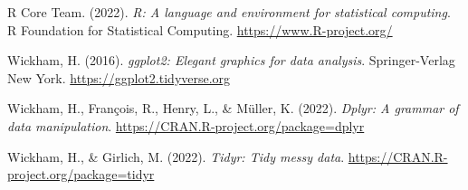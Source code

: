 \documentclass[
  man]{apa7}
\newlength{\cslhangindent}
\newlength{\cslentryspacingunit} %
\newenvironment{CSLReferences}[2] %
 {%
  \setlength{\parindent}{0pt}
  \ifodd #1
  \let\oldpar\par
  \def\par{\hangindent=\cslhangindent\oldpar}
  \fi
  \setlength{\parskip}{#2\cslentryspacingunit}
 }%
 {}
\begin{document}
\begin{CSLReferences}{1}{0}
\leavevmode{}%
R Core Team. (2022). \emph{R: A language and environment for statistical computing}. R Foundation for Statistical Computing. \url{https://www.R-project.org/}

\leavevmode{}%
Wickham, H. (2016). \emph{ggplot2: Elegant graphics for data analysis}. Springer-Verlag New York. \url{https://ggplot2.tidyverse.org}

\leavevmode{}%
Wickham, H., François, R., Henry, L., \& Müller, K. (2022). \emph{Dplyr: A grammar of data manipulation}. \url{https://CRAN.R-project.org/package=dplyr}

\leavevmode{}%
Wickham, H., \& Girlich, M. (2022). \emph{Tidyr: Tidy messy data}. \url{https://CRAN.R-project.org/package=tidyr}

\end{CSLReferences}
\end{document}
